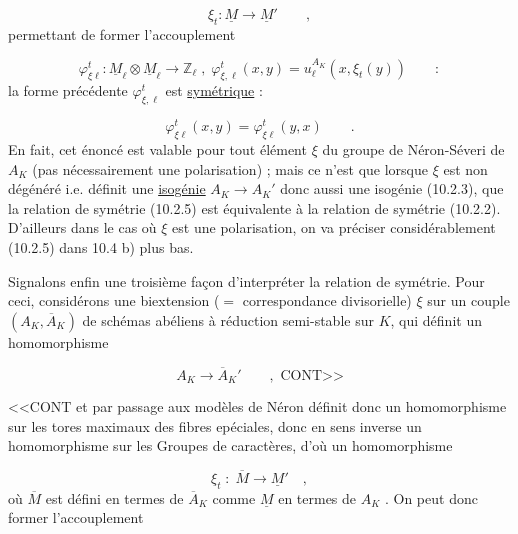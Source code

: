 \begin{equation}\tag{10.2.3}
\xi_t : \underline{M} \longrightarrow \underline{M}' \qquad ,
\end{equation}
permettant de former l'accouplement

\begin{equation}\tag{10.2.4}
\varphi^t_{\xi\ell} : \underline{M}_\ell \otimes \underline{M}_\ell \longrightarrow \mathbb{Z}_\ell \; , \; \varphi^t_{\xi,\ell}(x,y) = u_\ell^{A_K}(x,\xi_t(y)) \qquad :
\end{equation}
la forme précédente $\varphi^t_{\xi,\ell}$ est \underline{symétrique} :

\begin{equation}\tag{10.2.5}
\varphi^t_{\xi\ell}(x,y) = \varphi^t_{\xi\ell}(y,x) \qquad .
\end{equation}
En fait, cet énoncé est valable pour tout élément $\xi$ du groupe de Néron-Séveri de $A_K$ (pas nécessairement une polarisation) ; mais ce n'est que lorsque $\xi$ est non dégénéré i.e. définit une \underline{isogénie} $A_K \to A_K'$ donc aussi une isogénie (10.2.3), que la relation de symétrie (10.2.5) est équivalente à la relation de symétrie (10.2.2). D'ailleurs dans le cas où $\xi$ est une polarisation, on va préciser considérablement (10.2.5) dans 10.4 b) plus bas.

Signalons enfin une troisième façon d'interpréter la relation de symétrie. Pour ceci, considérons une biextension ($=$ correspondance divisorielle) $\xi$ sur un couple $(A_K,\overline{A}_K)$ de schémas abéliens à réduction semi-stable sur $K$, qui définit un homomorphisme

\begin{equation*}
A_K \longrightarrow \overline{A}_K' \qquad , \text{ CONT>>}
\end{equation*}


<<CONT et par passage aux modèles de Néron définit donc un homomorphisme sur les tores maximaux des fibres epéciales, donc en sens inverse un homomorphisme sur les Groupes de caractères, d'où un homomorphisme

\begin{equation}\tag{10.2.6}
\xi_t \; : \; \overline{M} \longrightarrow \underline{M}' \quad ,
\end{equation}
où $\overline{M}$ est défini en termes de $\overline{A}_K$ comme $\underline{M}$ en termes de $A_K$ . On peut donc former l'accouplement

